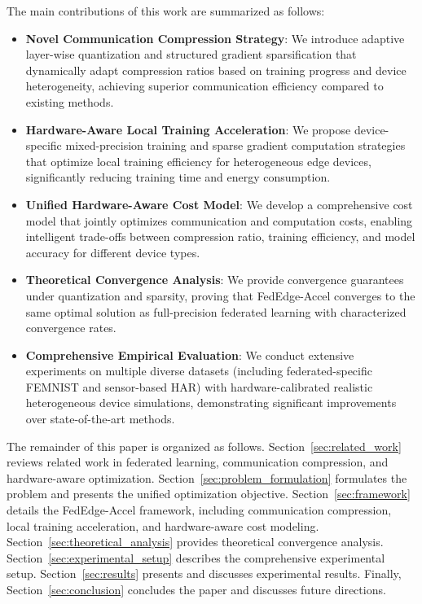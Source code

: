 \documentclass[journal]{IEEEtran}
\begin{document}
The main contributions of this work are summarized as follows:

\begin{itemize}
    \item \textbf{Novel Communication Compression Strategy}: We introduce adaptive layer-wise quantization and structured gradient sparsification that dynamically adapt compression ratios based on training progress and device heterogeneity, achieving superior communication efficiency compared to existing methods.
    
    \item \textbf{Hardware-Aware Local Training Acceleration}: We propose device-specific mixed-precision training and sparse gradient computation strategies that optimize local training efficiency for heterogeneous edge devices, significantly reducing training time and energy consumption.
    
    \item \textbf{Unified Hardware-Aware Cost Model}: We develop a comprehensive cost model that jointly optimizes communication and computation costs, enabling intelligent trade-offs between compression ratio, training efficiency, and model accuracy for different device types.
    
    \item \textbf{Theoretical Convergence Analysis}: We provide convergence guarantees under quantization and sparsity, proving that FedEdge-Accel converges to the same optimal solution as full-precision federated learning with characterized convergence rates.
    
    \item \textbf{Comprehensive Empirical Evaluation}: We conduct extensive experiments on multiple diverse datasets (including federated-specific FEMNIST and sensor-based HAR) with hardware-calibrated realistic heterogeneous device simulations, demonstrating significant improvements over state-of-the-art methods.
\end{itemize}

The remainder of this paper is organized as follows. Section~\ref{sec:related_work} reviews related work in federated learning, communication compression, and hardware-aware optimization. Section~\ref{sec:problem_formulation} formulates the problem and presents the unified optimization objective. Section~\ref{sec:framework} details the FedEdge-Accel framework, including communication compression, local training acceleration, and hardware-aware cost modeling. Section~\ref{sec:theoretical_analysis} provides theoretical convergence analysis. Section~\ref{sec:experimental_setup} describes the comprehensive experimental setup. Section~\ref{sec:results} presents and discusses experimental results. Finally, Section~\ref{sec:conclusion} concludes the paper and discusses future directions.
\end{document}
